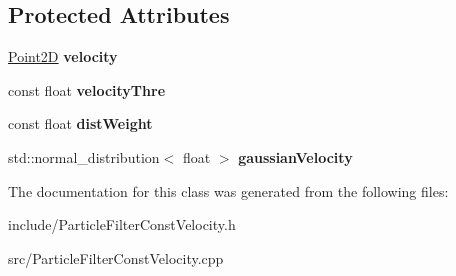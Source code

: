 \subsection*{Protected Attributes}
\begin{DoxyCompactItemize}
\item 
\hypertarget{classParticleFilterConstVelocity_af83994fb61bff4a728acced41bdc8cb5}{}\hyperlink{classPoint2D}{Point2\+D} {\bfseries velocity}\label{classParticleFilterConstVelocity_af83994fb61bff4a728acced41bdc8cb5}

\item 
\hypertarget{classParticleFilterConstVelocity_a8e1644ddf56f1c1b20278ca70cdb62ff}{}const float {\bfseries velocity\+Thre}\label{classParticleFilterConstVelocity_a8e1644ddf56f1c1b20278ca70cdb62ff}

\item 
\hypertarget{classParticleFilterConstVelocity_a022c54f062dd30fb21c73945a888b99f}{}const float {\bfseries dist\+Weight}\label{classParticleFilterConstVelocity_a022c54f062dd30fb21c73945a888b99f}

\item 
\hypertarget{classParticleFilterConstVelocity_a4ebdf630669691c8d00fa1f94022921a}{}std\+::normal\+\_\+distribution$<$ float $>$ {\bfseries gaussian\+Velocity}\label{classParticleFilterConstVelocity_a4ebdf630669691c8d00fa1f94022921a}

\end{DoxyCompactItemize}


The documentation for this class was generated from the following files\+:\begin{DoxyCompactItemize}
\item 
include/Particle\+Filter\+Const\+Velocity.\+h\item 
src/Particle\+Filter\+Const\+Velocity.\+cpp\end{DoxyCompactItemize}
